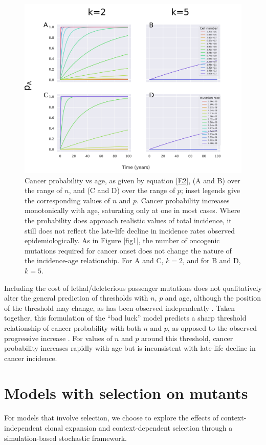 \documentclass[9pt,twocolumn,twoside]{pnas-new}
\begin{document}
\begin{figure}[!th]
	\centering
	\includegraphics[width=\linewidth]{fig2.png}
	\caption{Cancer probability vs age, as given by equation \ref{E2}, (A and B) over the range of $n$, and (C and D) over the range of $p$; inset legends give the corresponding values of $n$ and $p$. Cancer probability increases monotonically with age, saturating only at one in most cases. Where the probability does approach realistic values of total incidence, it still does not reflect the late-life decline in incidence rates observed epidemiologically. As in Figure \ref{fig1}, the number of oncogenic mutations required for cancer onset does not change the nature of the incidence-age relationship. For A and C, $k=2$, and for B and D, $k=5$.}
	\label{fig2}
\end{figure}

Including the cost of lethal/deleterious passenger mutations does not qualitatively alter the general prediction of thresholds with $n$, $p$ and age, although the position of the threshold may change, as has been observed independently \cite{McFarland2013}. Taken together, this formulation of the ``bad luck'' model predicts a sharp threshold relationship of cancer probability with both $n$ and $p$, as opposed to the observed progressive increase \cite{Tomasetti78, Tomasetti2017}. For values of $n$ and $p$ around this threshold, cancer probability increases rapidly with age but is inconsistent with late-life decline in cancer incidence.

\section{Models with selection on mutants}
For models that involve selection, we choose to explore the effects of context-independent clonal expansion and context-dependent selection through a simulation-based stochastic framework. 
\end{document}
